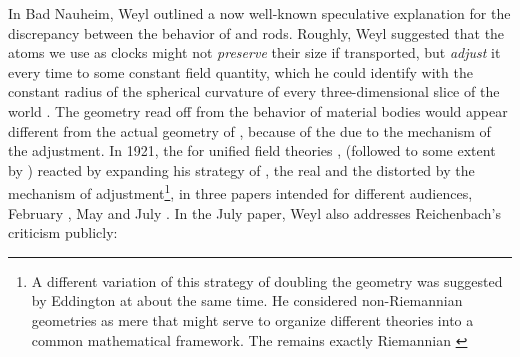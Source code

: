 \documentclass[draft]{article}
\begin{document}
%
In Bad Nauheim, Weyl outlined a now well-known speculative explanation for the discrepancy between the behavior of  and  rods. Roughly, Weyl suggested that the atoms we use as clocks might not \emph{preserve} their size if transported, but \emph{adjust} it every time to some constant field quantity, which he could identify with the constant radius of the spherical curvature of every three-dimensional slice of the world \citep{Weyl1920a}. The geometry read off from the behavior of material bodies would appear different from the actual geometry of \spti, because of the  due to the mechanism of the adjustment. In 1921, the  for unified field theories \citep[ch.\ 4]{Vizgin1994}, \Weyl (followed to some extent by \cite{Eddington1921,Eddington1921a}) reacted by expanding his strategy of , the real  and the  distorted by the mechanism of adjustment\footnote{A different variation of this strategy of doubling the geometry was suggested by Eddington at about the same time. He considered non-Riemannian geometries as mere  that might serve to organize different theories into a common mathematical framework. The  remains exactly Riemannian \citep{Eddington1921}}, in three papers intended for different audiences, February \citep{Weyl1921a}, May \citep{Weyl1921d} and July \citep{Weyl1921e}. In the July paper, Weyl also addresses Reichenbach's criticism publicly:
\end{document}
